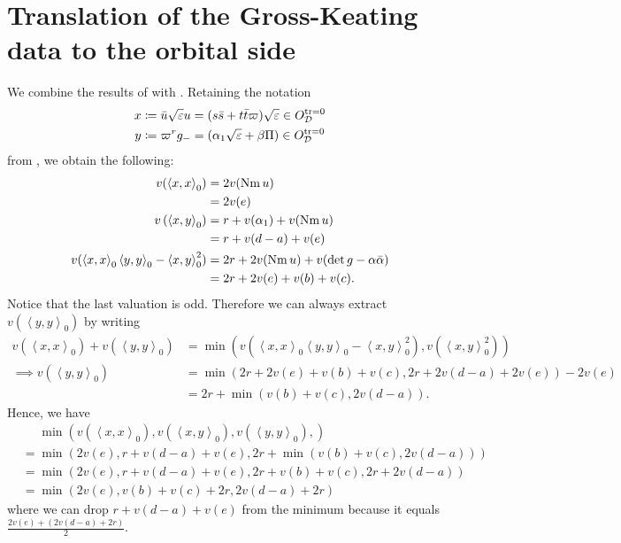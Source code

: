 \section{Translation of the Gross-Keating data to the orbital side}
We combine the results of  with .
Retaining the notation
\begin{align*}
  x &\coloneqq \bar u \sqrt{\varepsilon} u = (s \bar s + t \bar t \varpi) \sqrt{\varepsilon} \in O_\mathcal D^{\operatorname{tr} = 0} \\
  y &\coloneqq \varpi^r g_- = (\alpha_1\sqrt{\varepsilon} + \beta \Pi) \in O_\mathcal D^{\operatorname{tr} = 0}
\end{align*}
from , we obtain the following:
\begin{align*}
  v(\left\langle x,x \right\rangle _0)
    &= 2 v(\operatorname{Nm} u) \\
    &= 2v(e) \\
  v\left( \left\langle x,y \right\rangle _0 \right)
    &= r + v(\alpha_1) + v(\operatorname{Nm} u) \\
    &= r + v(d-a) + v(e) \\
  v(
    \left\langle x,x \right\rangle _0 \left\langle y,y \right\rangle _0
    - \left\langle x,y \right\rangle^2_0
  )
    &= 2r + 2 v(\operatorname{Nm} u) + v(\det g - \alpha \bar \alpha) \\
    &= 2r + 2v(e) + v(b) + v(c).
\end{align*}
Notice that the last valuation is odd.
Therefore we can always extract $v(\left\langle y,y \right\rangle _0)$ by writing
\begin{align*}
  v\left(\left\langle x,x \right\rangle _0\right) + v\left(\left\langle y,y \right\rangle _0\right)
  &= \min \left( v\left( \left\langle x,x \right\rangle _0 \left\langle y,y \right\rangle _0 - \left\langle x,y \right\rangle^2_0 \right),
    v(\left\langle x,y \right\rangle^2_0) \right) \\
  \implies  v\left(\left\langle y,y \right\rangle _0\right)
  &= \min(2r + 2v(e) + v(b) + v(c), 2r + 2v(d-a) + 2v(e)) - 2v(e) \\
  &= 2r + \min(v(b) + v(c), 2v(d-a)).
\end{align*}
Hence, we have
\begin{align*}
  &\phantom= \min\left(
    v(\left\langle x,x \right\rangle _0),
    v(\left\langle x,y \right\rangle _0),
    v(\left\langle y,y \right\rangle _0),
  \right) \\
  &= \min\left( 2v(e), r+v(d-a)+v(e), 2r+\min(v(b)+v(c), 2v(d-a)) \right) \\
  &= \min\left( 2v(e), r+v(d-a)+v(e), 2r+v(b)+v(c), 2r+2v(d-a) \right) \\
  &= \min\left( 2v(e), v(b)+v(c)+2r, 2v(d-a)+2r \right)
\end{align*}
where we can drop $r+v(d-a)+v(e)$ from the minimum because it equals
$\frac{2v(e) + (2v(d-a)+2r)}{2}$.

